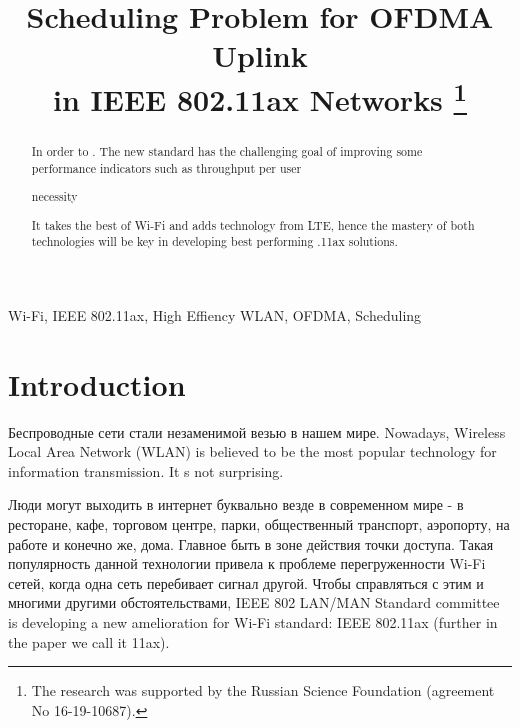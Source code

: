 
%


\IEEEoverridecommandlockouts

\title{%
Scheduling Problem for OFDMA Uplink \\in IEEE 802.11ax Networks
\thanks{The research was supported by the Russian Science Foundation (agreement No 16-19-10687).}}

\author{
}

\maketitle

\begin{abstract}
In order to . The new standard has the challenging goal of improving some performance indicators such as throughput per user

necessity

It takes the best of Wi-Fi and adds technology from LTE, hence the mastery of both technologies will be key in developing best performing .11ax solutions.
	
\end{abstract}

\begin{IEEEkeywords}
	Wi-Fi, IEEE 802.11ax, High Effiency WLAN, OFDMA, Scheduling
\end{IEEEkeywords}

\section{Introduction}

Беспроводные сети стали незаменимой везью в нашем мире. Nowadays, Wireless Local Area Network (WLAN) is believed to be the most popular technology for information transmission. It s not surprising. 

Люди могут выходить в интернет буквально везде в современном мире - в ресторане, кафе, торговом центре, парки, общественный транспорт, аэропорту, на работе и конечно же, дома. Главное быть в зоне действия точки доступа. Такая популярность данной технологии привела к проблеме перегруженности Wi-Fi сетей, когда одна сеть перебивает сигнал другой. Чтобы справляться с этим и многими другими обстоятельствами, IEEE 802 LAN/MAN Standard committee is developing a new amelioration for Wi-Fi standard: IEEE 802.11ax (further in the paper we call it 11ax). 


